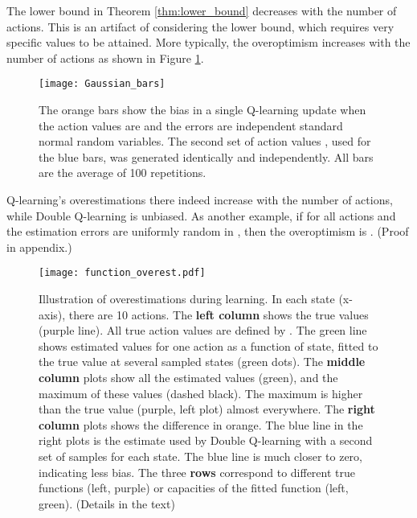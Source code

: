 \documentclass[letterpaper]{article}
\begin{document}
The lower bound in Theorem \ref{thm:lower_bound} decreases with the number of actions. This is an artifact of considering the lower bound, which requires very specific values to be attained. More typically, the overoptimism increases with the number of actions as shown in Figure \ref{Gauss_bars}.
\begin{figure}[t]
\begin{center}
\texttt{[image: Gaussian\_bars]}
\caption{\label{Gauss_bars} The orange bars show the bias in a single Q-learning update when the action values are  and the errors  are independent standard normal random variables.  The second set of action values , used for the blue bars, was generated identically and independently.  All bars are the average of 100 repetitions.  }
\end{center}
\end{figure}
Q-learning's overestimations there indeed increase with the number of actions, while Double Q-learning is unbiased.
As another example, if for all actions  and the estimation errors  are uniformly random in , then the overoptimism is . (Proof in appendix.)
\begin{figure*}[t]
\centering
\texttt{[image: function\_overest.pdf]}
\caption{\label{function_overest}
\small{
Illustration of overestimations during learning. In each state (x-axis), there are 10 actions. The \textbf{left column} shows the true values  (purple line). All true action values are defined by . The green line shows estimated values  for one action as a function of state, fitted to the true value at several sampled states (green dots).
The \textbf{middle column} plots show all the estimated values (green), and the maximum of these values (dashed black). The maximum is higher than the true value (purple, left plot) almost everywhere. The \textbf{right column} plots shows the difference in orange. The blue line in the right plots is the estimate used by Double Q-learning with a second set of samples for each state. The blue line is much closer to zero, indicating less bias. The three \textbf{rows} correspond to different true functions (left, purple) or capacities of the fitted function (left, green). (Details in the text) 
}}
\end{figure*}
\end{document}
